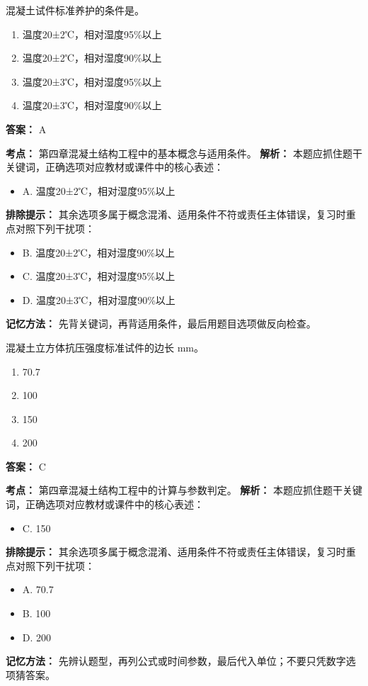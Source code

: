 \documentclass[UTF8,fontset=fandol,11pt]{ctexart}
\begin{document}
\begin{quizbox}[title={第 52 题}]
混凝土试件标准养护的条件是。\\
\begin{enumerate}[label=\Alph*.]
\item 温度20±2℃，相对湿度95\%以上
\item 温度20±2℃，相对湿度90\%以上
\item 温度20±3℃，相对湿度95\%以上
\item 温度20±3℃，相对湿度90\%以上
\end{enumerate}
\textbf{答案：} A
\vspace{0.25em}
\begin{answerbox}[title={考点解析}]
\textbf{考点：} 第四章混凝土结构工程中的基本概念与适用条件。
\textbf{解析：} 本题应抓住题干关键词，正确选项对应教材或课件中的核心表述：
\begin{itemize}
\item A. 温度20±2℃，相对湿度95\%以上
\end{itemize}
\textbf{排除提示：} 其余选项多属于概念混淆、适用条件不符或责任主体错误，复习时重点对照下列干扰项：
\begin{itemize}
\item B. 温度20±2℃，相对湿度90\%以上
\item C. 温度20±3℃，相对湿度95\%以上
\item D. 温度20±3℃，相对湿度90\%以上
\end{itemize}
\textbf{记忆方法：} 先背关键词，再背适用条件，最后用题目选项做反向检查。
\end{answerbox}
\end{quizbox}

\begin{quizbox}[title={第 53 题}]
混凝土立方体抗压强度标准试件的边长 mm。\\
\begin{enumerate}[label=\Alph*.]
\item 70.7
\item 100
\item 150
\item 200
\end{enumerate}
\textbf{答案：} C
\vspace{0.25em}
\begin{answerbox}[title={考点解析}]
\textbf{考点：} 第四章混凝土结构工程中的计算与参数判定。
\textbf{解析：} 本题应抓住题干关键词，正确选项对应教材或课件中的核心表述：
\begin{itemize}
\item C. 150
\end{itemize}
\textbf{排除提示：} 其余选项多属于概念混淆、适用条件不符或责任主体错误，复习时重点对照下列干扰项：
\begin{itemize}
\item A. 70.7
\item B. 100
\item D. 200
\end{itemize}
\textbf{记忆方法：} 先辨认题型，再列公式或时间参数，最后代入单位；不要只凭数字选项猜答案。
\end{answerbox}
\end{quizbox}
\end{document}
